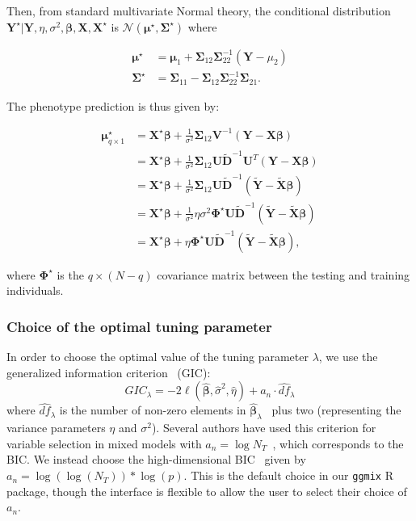 \documentclass[10pt,letterpaper]{article}
\newcommand{\bX}{\textbf{X}}
\newcommand{\bY}{\textbf{Y}}
\newcommand{\bD}{\textbf{D}}
\newcommand{\bXtilde}{\widetilde{\bX}}
\newcommand{\bYtilde}{\widetilde{\bY}}
\newcommand{\bDtilde}{\widetilde{\bD}}
\newcommand{\bU}{\textbf{U}}
\newcommand{\bV}{\textbf{V}}
\newcommand{\bSigma}{\boldsymbol{\Sigma}}
\newcommand{\bmu}{\boldsymbol{\mu}}
\newcommand{\bbeta}{\boldsymbol{\beta}}
\newcommand{\bPhi}{\boldsymbol{\Phi}}
\begin{document}
Then, from standard multivariate Normal theory, the conditional distribution $\bY^\star | \bY, \eta, \sigma^2, \bbeta,\bX, \bX^\star$ is $\mathcal{N}(\bmu^\star, \bSigma^\star)$ where

\begin{align*}
\bmu^\star &= \bmu_1 + \bSigma_{12} \bSigma_{22}^{-1} (\bY - \mu_2) \\
\bSigma^\star & = \bSigma_{11} - \bSigma_{12} \bSigma_{22}^{-1} \bSigma_{21}.
\end{align*}

The phenotype prediction is thus given by:

\begin{align*}
\bmu^\star_{q \times 1} & = \bX^\star \bbeta + \frac{1}{\sigma^2} \bSigma_{12} \bV^{-1} (\bY - \bX \bbeta)\\
& = \bX^\star \bbeta + \frac{1}{\sigma^2} \bSigma_{12} \bU \bDtilde^{-1} \bU^T (\bY - \bX \bbeta)\\
& = \bX^\star \bbeta + \frac{1}{\sigma^2} \bSigma_{12} \bU \bDtilde^{-1} (\bYtilde - \bXtilde \bbeta ) \\
& = \bX^\star \bbeta + \frac{1}{\sigma^2} \eta \sigma^2 \bPhi^\star \bU \bDtilde^{-1} (\bYtilde - \bXtilde \bbeta ) \\
& = \bX^\star \bbeta +  \eta  \bPhi^\star \bU \bDtilde^{-1} (\bYtilde - \bXtilde \bbeta ),
\end{align*}

where $\bPhi^\star$ is the $q \times (N-q)$ covariance matrix between the testing and training individuals.


\subsubsection*{Choice of the optimal tuning parameter} \label{subsubsec:gic}

In order to choose the optimal value of the tuning parameter $\lambda$, we use the generalized information criterion~\cite{nishii1984asymptotic} (GIC):
\begin{equation}
GIC_{\lambda} = -2 \ell(\widehat{\bbeta}, \widehat{\sigma}^2, \widehat{\eta}) + a_n \cdot \widehat{df}_{\lambda}
\end{equation}
where $\widehat{df}_{\lambda}$ is the number of non-zero elements in $\widehat{\bbeta}_{\lambda}$~\cite{zou2007degrees} plus two (representing the variance parameters $\eta$ and $\sigma^2$). Several authors have used this criterion for variable selection in mixed models with $a_n = \log N_T$~\cite{bondell2010joint,schelldorfer2011estimation}, which corresponds to the BIC. We instead choose the high-dimensional BIC~\cite{fan2013tuning} given by $a_n = \log(\log(N_T)) * \log(p)$. This is the default choice in our \texttt{ggmix} R package, though the interface is flexible to allow the user to select their choice of $a_n$.
\end{document}
